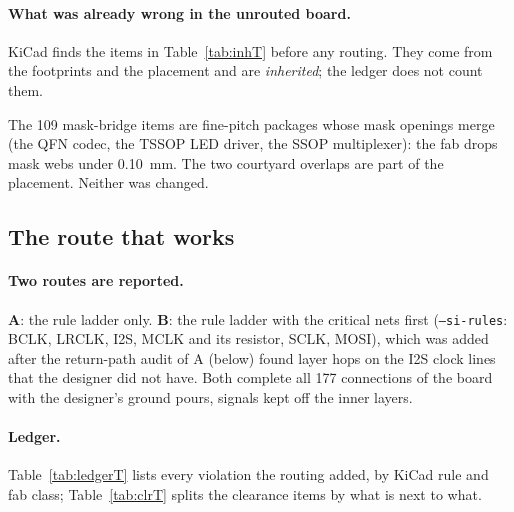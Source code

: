 \documentclass[10pt,a4paper]{article}
\begin{document}
\paragraph{What was already wrong in the unrouted board.} KiCad finds the items in Table~\ref{tab:inhT} before any routing. They come from the footprints and the placement and are \emph{inherited}; the ledger does not count them.
\begin{table}[H]\centering\small\caption{Violations already present in the board with the designer's planes and no routing.}\label{tab:inhT}\end{table}
The 109 mask-bridge items are fine-pitch packages whose mask openings merge (the QFN codec, the TSSOP LED driver, the SSOP multiplexer): the fab drops mask webs under 0.10~mm. The two courtyard overlaps are part of the placement. Neither was changed.

\subsection{The route that works}\label{sec:routeT}

\paragraph{Two routes are reported.} \textbf{A}: the rule ladder only. \textbf{B}: the rule ladder with the critical nets first (\texttt{--si-rules}: BCLK, LRCLK, I2S, MCLK and its resistor, SCLK, MOSI), which was added after the return-path audit of A (below) found layer hops on the I2S clock lines
that the designer did not have. Both complete all 177 connections of the board with the designer's ground pours, signals kept off the inner layers.

\begin{table}[H]\centering\small\caption{The layouts side by side (KiCad 10.0.6, zones refilled).}\end{table}

\paragraph{Ledger.} Table~\ref{tab:ledgerT} lists every violation the routing added, by KiCad rule and fab class; Table~\ref{tab:clrT} splits the clearance items by what is next to what.
\begin{table}[H]\centering\small\caption{Compromise ledger by rule and class (counts of KiCad violations).}\label{tab:ledgerT}\end{table}
\begin{table}[H]\centering\small\caption{Clearance items by pair, with the smallest actual gap in mm (required: 0.2).}\label{tab:clrT}\end{table}
\end{document}
